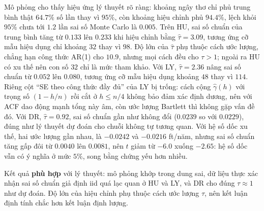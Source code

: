  Mô phỏng cho thấy hiệu ứng lý thuyết rõ ràng: khoảng ngây thơ chỉ phủ trung bình thật $64.7\%$ số lần thay vì $95\%$, còn khoảng hiệu chỉnh phủ $94.4\%$, lệch khỏi $95\%$ chưa tới $1.2$ lần sai số Monte Carlo là $0.005$. Trên HU, sai số chuẩn của trung bình tăng từ $0.133$ lên $0.233$ khi hiệu chỉnh bằng $\hat\tau=3.09$, tương ứng cỡ mẫu hiệu dụng chỉ khoảng $32$ thay vì $98$. Độ lớn của $\hat\tau$ phụ thuộc cách ước lượng, chẳng hạn công thức AR(1) cho $10.9$, nhưng mọi cách đều cho $\tau>1$; ngoài ra HU có xu thế nên con số $32$ chỉ là mức tham khảo. Với LY, $\hat\tau=2.36$ nâng sai số chuẩn từ $0.052$ lên $0.080$, tương ứng cỡ mẫu hiệu dụng khoảng $48$ thay vì $114$. Riêng cột ``SE theo công thức đầy đủ'' của LY bị trống: cách cộng $\hat\gamma(h)$ với trọng số $(1-h/n)$ rồi cắt ở $h\le n/4$ không bảo đảm xác định dương, nên với ACF dao động mạnh tổng này âm, còn ước lượng Bartlett thì không gặp vấn đề đó. Với DR, $\hat\tau=0.92$, sai số chuẩn gần như không đổi ($0.0239$ so với $0.0229$), đúng như lý thuyết dự đoán cho chuỗi không tự tương quan. Với hệ số dốc xu thế, hai ước lượng gần nhau, là $-0.0242$ và $-0.0216$ ft/năm, nhưng sai số chuẩn tăng gấp đôi từ $0.0040$ lên $0.0081$, nên $t$ giảm từ $-6.0$ xuống $-2.65$: hệ số dốc vẫn có ý nghĩa ở mức $5\%$, song bằng chứng yếu hơn nhiều.

 Kết quả \textbf{phù hợp} với lý thuyết: mô phỏng khớp trong dung sai, dữ liệu thực xác nhận sai số chuẩn giả định iid quá lạc quan ở HU và LY, và DR cho đúng $\tau\approx1$ như dự đoán. Độ lớn của hiệu chỉnh phụ thuộc cách ước lượng $\tau$, nên kết luận định tính chắc hơn kết luận định lượng.

